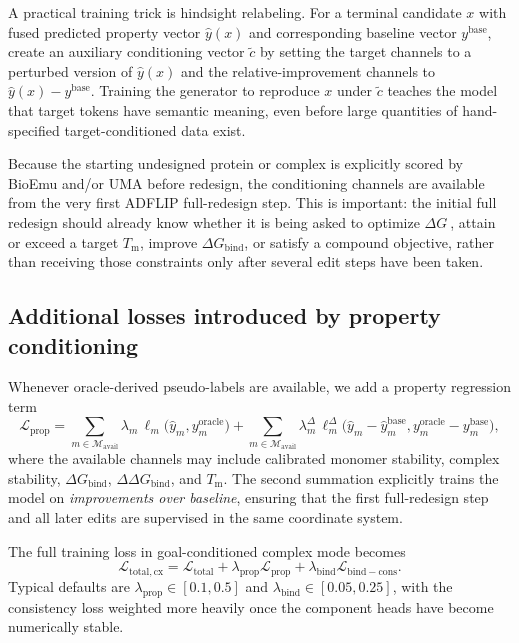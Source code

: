 \documentclass[11pt]{article}
\newcommand{\dG}{\ensuremath{\Delta G \ }}
\newcommand{\Tm}{\ensuremath{T_{\mathrm m}}}
\newcommand{\DGbind}{\ensuremath{\Delta G_{\mathrm{bind}}}}
\newcommand{\DDGbind}{\ensuremath{\Delta\Delta G_{\mathrm{bind}}}}
\begin{document}
A practical training trick is hindsight relabeling. For a terminal candidate $x$ with fused predicted property vector $\widehat y(x)$ and corresponding baseline vector $y^{\mathrm{base}}$, create an auxiliary conditioning vector $\widetilde c$ by setting the target channels to a perturbed version of $\widehat y(x)$ and the relative-improvement channels to $\widehat y(x)-y^{\mathrm{base}}$. Training the generator to reproduce $x$ under $\widetilde c$ teaches the model that target tokens have semantic meaning, even before large quantities of hand-specified target-conditioned data exist.

Because the starting undesigned protein or complex is explicitly scored by BioEmu and/or UMA before redesign, the conditioning channels are available from the very first ADFLIP full-redesign step. This is important: the initial full redesign should already know whether it is being asked to optimize \dG, attain or exceed a target \Tm, improve \DGbind, or satisfy a compound objective, rather than receiving those constraints only after several edit steps have been taken.



\subsection{Additional losses introduced by property conditioning}

Whenever oracle-derived pseudo-labels are available, we add a property regression term
\begin{equation}
\label{eq:proploss}
    \mathcal{L}_{\mathrm{prop}} = \sum_{m\in\mathcal{M}_{\mathrm{avail}}} \lambda_m\,\ell_m\!\big(\widehat y_m, y_m^{\mathrm{oracle}}\big)
    +
    \sum_{m\in\mathcal{M}_{\mathrm{avail}}} \lambda_m^{\Delta}\,\ell_m^{\Delta}\!\big(\widehat y_m-\widehat y_m^{\mathrm{base}}, y_m^{\mathrm{oracle}}-y_m^{\mathrm{base}}\big),
\end{equation}
where the available channels may include calibrated monomer stability, complex stability, \DGbind, \DDGbind, and \Tm. The second summation explicitly trains the model on \emph{improvements over baseline}, ensuring that the first full-redesign step and all later edits are supervised in the same coordinate system.

The full training loss in goal-conditioned complex mode becomes
\begin{equation}
\label{eq:totallosscx}
    \mathcal{L}_{\mathrm{total,cx}} = \mathcal{L}_{\mathrm{total}} + \lambda_{\mathrm{prop}}\mathcal{L}_{\mathrm{prop}} + \lambda_{\mathrm{bind}}\mathcal{L}_{\mathrm{bind-cons}}.
\end{equation}
Typical defaults are $\lambda_{\mathrm{prop}}\in[0.1,0.5]$ and $\lambda_{\mathrm{bind}}\in[0.05,0.25]$, with the consistency loss weighted more heavily once the component heads have become numerically stable.
\end{document}
